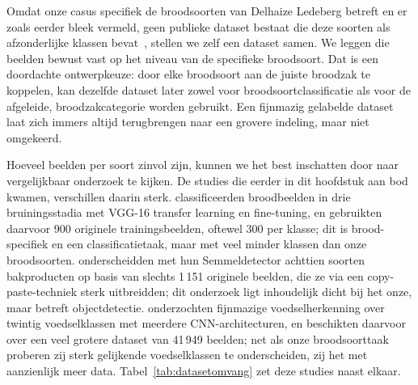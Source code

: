 Omdat onze casus specifiek de broodsoorten van Delhaize Ledeberg betreft en er zoals
eerder bleek vermeld, geen publieke dataset bestaat die deze soorten als afzonderlijke
klassen bevat~\autocite{Schmitt2025,Ciapas2023}, stellen we zelf een dataset samen. We
leggen die beelden bewust vast op het niveau van de specifieke broodsoort. Dat is een
doordachte ontwerpkeuze: door elke broodsoort aan de juiste broodzak te koppelen, kan
dezelfde dataset later zowel voor broodsoortclassificatie als voor de afgeleide,  broodzakcategorie worden gebruikt. Een fijnmazig gelabelde dataset laat
zich immers altijd terugbrengen naar een grovere indeling, maar niet omgekeerd.


Hoeveel beelden per soort zinvol zijn, kunnen we het best inschatten door naar
vergelijkbaar onderzoek te kijken. De studies die eerder in dit hoofdstuk aan bod
kwamen, verschillen daarin sterk. \textcite{Tantiphanwadi2022} classificeerden
broodbeelden in drie bruiningsstadia met VGG-16 transfer learning en fine-tuning, en
gebruikten daarvoor 900 originele trainingsbeelden, oftewel 300 per klasse; dit is
brood-specifiek en een classificatietaak, maar met veel minder klassen dan onze
broodsoorten. \textcite{Schmitt2025} onderscheidden met hun Semmeldetector achttien
soorten bakproducten op basis van slechts 1\,151 originele beelden, die ze via een
copy-paste-techniek sterk uitbreidden; dit onderzoek ligt inhoudelijk dicht bij het
onze, maar betreft objectdetectie. \textcite{Boyd2024} onderzochten fijnmazige
voedselherkenning over twintig voedselklassen met meerdere CNN-architecturen, en
beschikten daarvoor over een veel grotere dataset van 41\,949 beelden; net als onze
broodsoorttaak proberen zij sterk gelijkende voedselklassen te onderscheiden, zij het
met aanzienlijk meer data. Tabel~\ref{tab:datasetomvang} zet deze
studies naast elkaar.


